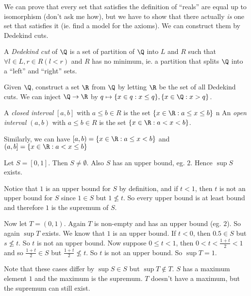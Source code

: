 \documentclass[a4paper]{article}
\begin{document}
  We can prove that every set that satisfies the definition of ``reals'' are equal up to isomorphism (don't ask me how), but we have to show that there actually \emph{is} one set that satisfies it (ie. find a model for the axioms). We can construct them by Dedekind cuts.

  \begin{defi}
    A \emph{Dedekind cut} of $\Q$ is a set of partition of $\Q$ into $L$ and $R$ such that $\forall l\in L, r\in R(l < r)$ and $R$ has no minimum, ie. a partition that splits $\Q$ into a ``left'' and ``right'' sets.
  \end{defi}

  Given $\Q$, construct a set $\R$ from $\Q$ by letting $\R$ be the set of all Dedekind cuts. We can inject $\Q\to \R$ by $q\mapsto \{x\in q: x \leq q\}, \{x\in \Q: x> q\}$. 

  \begin{defi}
    A \emph{closed interval} $[a, b]$ with $a \leq b\in R$ is the set $\{x\in \R: a\leq x\leq b\}$
    n  An \emph{open interval} $(a, b)$ with $a \leq b\in R$ is the set $\{x\in \R: a< x< b\}$.
  \end{defi}

  Similarly, we can have $[a, b) = \{x\in \R: a\leq x < b\}$ and $(a, b] = \{x\in \R: a< x \leq b\}$

  \begin{eg}
    Let $S = [0, 1]$. Then $S\not= \emptyset$. Also $S$ has an upper bound, eg. $2$. Hence $\sup S$ exists.

    Notice that $1$ is an upper bound for $S$ by definition, and if $t < 1$, then $t$ is not an upper bound for $S$ since $1\in S$ but $1\not\leq t$. So every upper bound is at least bound and therefore $1$ is the supremum of $S$. 

    Now let $T = (0, 1)$. Again $T$ is non-empty and has an upper bound (eg. $2$). So again $\sup T$ exists. We know that $1$ is an upper bound. If $t < 0$, then $0.5\in S$ but $s\not\leq t$. So $t$ is not an upper bound. Now suppose $0\leq t < 1$, then $0 < t < \frac{1 + t}{2} < 1$ and so $\frac{1 + t}{2}\in S$ but $\frac{1 + t}{2} \not\leq t$. So $t$ is not an upper bound. So $\sup T = 1$.

    Note that these cases differ by $\sup S\in S$ but $\sup T\not\in T$. $S$ has a maximum element $1$ and the maximum is the supremum. $T$ doesn't have a maximum, but the supremum can still exist.

  \end{eg}
\end{document}
